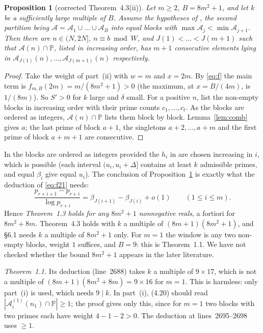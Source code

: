 \documentclass[11pt,a4paper]{amsart}
\newtheorem{proposition}[theorem]{Proposition}
\theoremstyle{remark}
\newcommand{\cA}{\mathcal{A}}
\newcommand{\PP}{\mathbb{P}}
\begin{document}
\begin{proposition}[corrected Theorem~4.3(ii)]\label{prop:43}
Let $m\ge2$, $B=8m^2+1$, and let $k$ be a sufficiently large multiple of $B$. Assume the hypotheses of
\cite[Theorem~4.3]{BFM}, the second partition being $\cA=\cA_1\cup\dots\cup\cA_B$ into equal blocks with
$\max\cA_j<\min\cA_{j+1}$. Then there are $n\in(N,2N]$, $n\equiv b\bmod W$, and $J(1)<\dots<J(m+1)$ such that
$\cA(n)\cap\PP$, listed in increasing order, has $m+1$ consecutive elements lying in
$\cA_{J(1)}(n),\dots,\cA_{J(m+1)}(n)$ respectively.
\end{proposition}

\begin{proof}
Take the weight of part~(ii) with $w=m$ and $x=2m$. By \eqref{eq:f} the main term is
$f_{m,B}(2m)=m/(8m^2+1)>0$ (the maximum, at $x=B/(4m)$, is $1/(8m)$). So $S'>0$ for $k$ large and $\delta$ small.
For a positive $n$, list the non-empty blocks in increasing order with their prime counts $c_1,\dots,c_t$. As the
blocks are ordered as integers, $\cA(n)\cap\PP$ lists them block by block. Lemma~\ref{lem:comb} gives $a$; the last prime of
block $a+1$, the singletons $a+2,\dots,a+m$ and the first prime of block $a+m+1$ are consecutive.
\end{proof}

In \cite[\S6]{BFM} the blocks are ordered as integers provided the $h_i$ in \cite[Lemma~5.2]{BFM} are chosen
increasing in $i$, which is possible (each interval $(u_i,u_i+\Delta]$ contains at least $k$ admissible primes, and
equal $\beta_i$ give equal $u_i$). The conclusion of Proposition~\ref{prop:43} is exactly what the deduction of
\eqref{eq:f21} needs:
\begin{equation}\label{eq:f21}
\frac{p_{r+i+1}-p_{r+i}}{\log p_{r+i}}=\beta_{J(i+1)}-\beta_{J(i)}+o(1)\qquad(1\le i\le m).
\end{equation}
Hence \emph{Theorem~1.3 holds for any $8m^2+1$ nonnegative reals}, a fortiori for $8m^2+8m$. Theorem~4.3 holds with
$k$ a multiple of $(8m+1)(8m^2+1)$, and \S6.1 needs $k$ a multiple of $8m^2+1$ only.
For $m=1$ the window is any two non-empty blocks, weight $1$ suffices, and $B=9$: this is Theorem~1.1. We have not
checked whether the bound $8m^2+1$ appears in the later literature.

\emph{Theorem~1.1.} Its deduction (line~2688) takes $k$ a multiple of $9\times17$, which is not a multiple of
$(8m+1)(8m^2+8m)=9\times16$ for $m=1$. This is harmless: only part~(i) is used, which needs $9\mid k$.
In part~(i), (4.20) should read $|\cA_i^{(1)}(n_1)\cap\PP|\ge1$; the proof gives only this, since for $m=1$ two blocks
with two primes each have weight $4-1-2>0$. The deduction at lines~2695--2698 uses $\ge1$.
\end{document}
